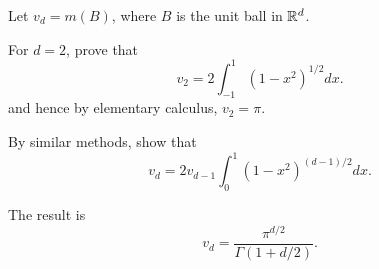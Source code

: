 \begin{exercise}
    Let $v_d = m(B)$, where $B$ is the unit ball in $\mathbb{R}^d$. 
    \begin{thmenum}
        \item For $d = 2$, prove that 
        \begin{equation*}
            v_2 = 2\int_{-1}^{1}(1-x^2)^{1/2}dx.
        \end{equation*}
        and hence by elementary calculus, $v_2 = \pi$. 
        \item By similar methods, show that 
        \begin{equation*}
            v_d = 2v_{d-1}\int_{0}^{1}(1-x^2)^{(d-1)/2}dx.
        \end{equation*}
        \item The result is 
        \begin{equation*}
            v_d = \frac{\pi^{d/2}}{\Gamma(1+d/2)}.
        \end{equation*}
    \end{thmenum}
\end{exercise}
